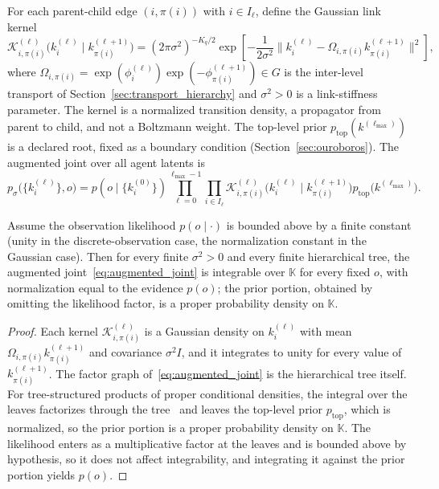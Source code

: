 \begin{definition}
\label{def:augmented_joint}
For each parent-child edge $(i, \pi(i))$ with $i \in I_\ell$, define the Gaussian link kernel
\begin{equation}
\mathcal{K}_{i,\pi(i)}^{(\ell)}\big(k_i^{(\ell)} \mid k_{\pi(i)}^{(\ell+1)}\big)
=
(2\pi\sigma^2)^{-K_q/2} \exp\left[-\frac{1}{2\sigma^2}
\big\|k_i^{(\ell)} - \Omega_{i,\pi(i)} k_{\pi(i)}^{(\ell+1)}\big\|^2\right],
\label{eq:gibbs_factor}
\end{equation}
where $\Omega_{i,\pi(i)} = \exp(\phi_i^{(\ell)})\exp(-\phi_{\pi(i)}^{(\ell+1)}) \in G$ is the inter-level transport of Section~\ref{sec:transport_hierarchy} and $\sigma^2 > 0$ is a link-stiffness parameter. The kernel is a normalized transition density, a propagator from parent to child, and not a Boltzmann weight. The top-level prior $p_{\mathrm{top}}(k^{(\ell_{\max})})$ is a declared root, fixed as a boundary condition (Section~\ref{sec:ouroboros}). The augmented joint over all agent latents is
\begin{equation}
p_{\sigma}\big(\{k_i^{(\ell)}\}, o\big)
=
p(o \mid \{k_i^{(0)}\}) \prod_{\ell = 0}^{\ell_{\max}-1} \prod_{i \in I_\ell} \mathcal{K}_{i,\pi(i)}^{(\ell)}\big(k_i^{(\ell)} \mid k_{\pi(i)}^{(\ell+1)}\big) p_{\mathrm{top}}\big(k^{(\ell_{\max})}\big).
\label{eq:augmented_joint}
\end{equation}
\end{definition}

\begin{lemma}
\label{lem:aug_joint_welldefined}
Assume the observation likelihood $p(o \mid \cdot)$ is bounded above by a finite constant (unity in the discrete-observation case, the normalization constant in the Gaussian case). Then for every finite $\sigma^2 > 0$ and every finite hierarchical tree, the augmented joint~\eqref{eq:augmented_joint} is integrable over $\mathbb{K}$ for every fixed $o$, with normalization equal to the evidence $p(o)$; the prior portion, obtained by omitting the likelihood factor, is a proper probability density on $\mathbb{K}$.
\end{lemma}

\begin{proof}
Each kernel $\mathcal{K}_{i,\pi(i)}^{(\ell)}$ is a Gaussian density on $k_i^{(\ell)}$ with mean $\Omega_{i,\pi(i)} k_{\pi(i)}^{(\ell+1)}$ and covariance $\sigma^2 I$, and it integrates to unity for every value of $k_{\pi(i)}^{(\ell+1)}$. The factor graph of~\eqref{eq:augmented_joint} is the hierarchical tree itself. For tree-structured products of proper conditional densities, the integral over the leaves factorizes through the tree~\cite[\S3.2]{Lauritzen1996} and leaves the top-level prior $p_{\mathrm{top}}$, which is normalized, so the prior portion is a proper probability density on $\mathbb{K}$. The likelihood enters as a multiplicative factor at the leaves and is bounded above by hypothesis, so it does not affect integrability, and integrating it against the prior portion yields $p(o)$.
\end{proof}

